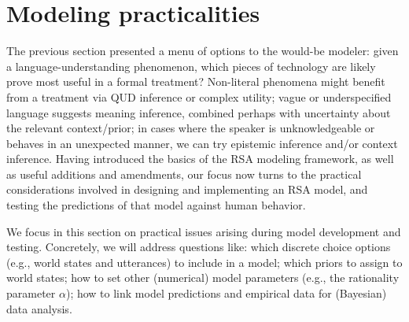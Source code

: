 \documentclass{sp}
\newcommand{\gcs}[1]{\textcolor{blue}{[gcs: #1]}}
\newcommand{\mht}[1]{\textcolor{purple}{[mht: #1]}}
\begin{document}
%


\section{Modeling practicalities} \label{practicalities}

The previous section presented a menu of options to the would-be modeler: given a language-understanding phenomenon, which pieces of technology are likely prove most useful in a formal treatment? Non-literal phenomena might benefit from a treatment via QUD inference or complex utility; vague or underspecified language suggests meaning inference, combined perhaps with uncertainty about the relevant context/prior; in cases where the speaker is unknowledgeable or behaves in an unexpected manner, we can try epistemic inference and/or context inference. Having introduced the basics of the RSA modeling framework, as well as useful additions and amendments, our focus now turns to the practical considerations involved in designing and implementing an RSA model, and testing the predictions of that model against human behavior.

We focus in this section on practical issues arising during model development and testing. Concretely, we will address questions like: which discrete choice options (e.g., world states and utterances) to include in a model; which priors to assign to world states; how to set other (numerical) model parameters (e.g., the rationality parameter $\alpha$); how to link model predictions and empirical data for (Bayesian) data analysis.
\end{document}
